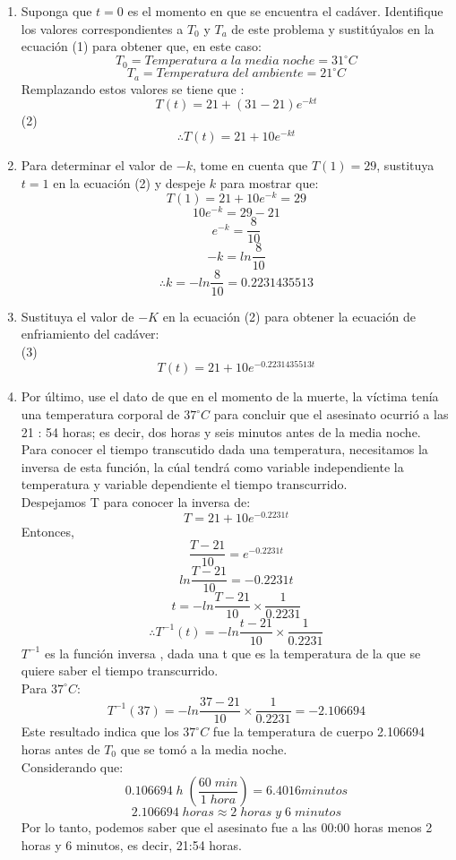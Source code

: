 \documentclass[12pt]{article}
\begin{document}
\begin{enumerate}
\item Suponga que $t = 0$ es el momento en que se encuentra el cadáver. Identifique los valores
correspondientes a $T_0$ y $T_a$ de este problema y sustitúyalos en la ecuación (1) para obtener
que, en este caso:
\[
T_0 = Temperatura \;a \;la\; media \;noche= 31  ^{\circ} C
\]
\[
T_a = Temperatura \;del \;ambiente = 21 ^{\circ}  C
\]
Remplazando estos valores se tiene que : 
\[
T(t)= 21 + (31-21)e^{-kt}
\]
(2)
\[
\therefore  T(t)= 21 + 10e^{-kt}
\]  
\item Para determinar el valor de $-k$, tome en cuenta que $T(1) = 29$, sustituya $t = 1$ en la ecuación (2) y despeje $k$ para mostrar que:
\[
 T(1)= 21 + 10e^{-k} = 29
\]  
\[
 10e^{-k} = 29-21
\]  
\[
  e^{-k} = \frac{8}{10}
\]  
\[
 -k = ln\frac{8}{10}
\]  
\[
 \therefore  k = -ln\frac{8}{10} = 0.2231435513
\] 
\item Sustituya el valor de $-K$ en la ecuación (2) para obtener la ecuación de enfriamiento del
cadáver:\\
(3)
\[
T(t)= 21 + 10e^{-0.2231435513t}
\] 
\item Por último, use el dato de que en el momento de la muerte, la víctima tenía una temperatura
corporal de $37  ^{\circ} C$ para concluir que el asesinato ocurrió a las 21 : 54 horas; es decir, dos horas y seis minutos antes de la media noche.
\\
Para conocer el tiempo transcutido dada una temperatura, necesitamos la inversa de esta función, la cúal tendrá como variable independiente la temperatura y variable dependiente el tiempo transcurrido. \\
Despejamos T para conocer la inversa de: 
\[
T= 21 + 10e^{-0.2231t}
\] 
Entonces, 
\[
\frac{T-21}{10}= e^{-0.2231t}
\] 
\[
ln \frac{T-21}{10}= -0.2231t
\] 
\[
t = -ln \frac{T-21}{10} \times \frac{1}{0.2231}
\]
\[
\therefore T^{-1}(t) = -ln \frac{t-21}{10} \times \frac{1}{0.2231}
\]
$T^{-1}$ es la función inversa , dada una t que es la temperatura de la que se quiere saber el tiempo transcurrido.\\
Para  $37  ^{\circ} C$:
\[
T^{-1}(37) = -ln \frac{37-21}{10} \times \frac{1}{0.2231} = -2.106694
\]
Este resultado indica que los $37  ^{\circ} C$ fue la temperatura de cuerpo 2.106694 horas antes de $T_0$ que se tomó a la media noche.\\
Considerando que:
\[
	0.106694\;h \;(\frac{60 \; min}{1\; hora}) = 6.4016 minutos
\]
\[
2.106694 \; horas \approx 2 \;horas \;y \;6 \;minutos
\]
Por lo tanto, podemos saber que el asesinato fue a las 00:00 horas menos 2 horas y 6 minutos, es decir, 21:54 horas.
\end{enumerate}
\end{document}
